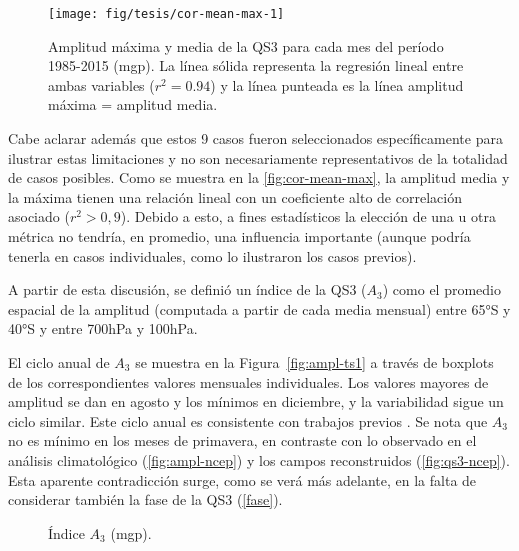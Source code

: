 \documentclass[spanish,a4paper,12pt,oneside]{book}
\begin{document}
\begin{figure}
\texttt{[image: fig/tesis/cor-mean-max-1]} \caption{Amplitud máxima y media de la QS3 para cada mes del período 1985-2015 (mgp). La línea sólida representa la regresión lineal entre ambas variables ($r^2 = 0.94 $) y la línea punteada es la línea amplitud máxima = amplitud media.}\label{fig:cor-mean-max}
\end{figure}

Cabe aclarar además que estos 9 casos fueron seleccionados
específicamente para ilustrar estas limitaciones y no son necesariamente
representativos de la totalidad de casos posibles. Como se muestra en la
\autoref{fig:cor-mean-max}, la amplitud media y la máxima tienen una
relación lineal con un coeficiente alto de correlación asociado
(\(r^2>0,9\)). Debido a esto, a fines estadísticos la elección de una u
otra métrica no tendría, en promedio, una influencia importante (aunque
podría tenerla en casos individuales, como lo ilustraron los casos
previos).

A partir de esta discusión, se definió un índice de la QS3 (\(A_3\))
como el promedio espacial de la amplitud (computada a partir de cada
media mensual) entre 65°S y 40°S y entre 700hPa y 100hPa.

El ciclo anual de \(A_3\) se muestra en la Figura~\ref{fig:ampl-ts1} a
través de boxplots de los correspondientes valores mensuales
individuales. Los valores mayores de amplitud se dan en agosto y los
mínimos en diciembre, y la variabilidad sigue un ciclo similar. Este
ciclo anual es consistente con trabajos previos
\citep{Loon1972, Karoly1985, Raphael2004}. Se nota que \(A_3\) no es
mínimo en los meses de primavera, en contraste con lo observado en el
análisis climatológico (\autoref{fig:ampl-ncep}) y los campos
reconstruidos (\autoref{fig:qs3-ncep}). Esta aparente contradicción
surge, como se verá más adelante, en la falta de considerar también la
fase de la QS3 (\autoref{fase}).

\begin{figure}
\newline{}\caption{Índice $A_3$ (mgp).}\label{fig:ampl-ts}
\end{figure}
\end{document}
